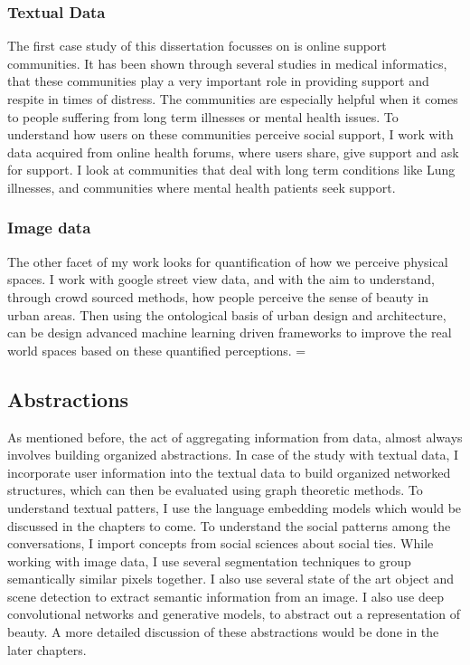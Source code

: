 \subsubsection{Textual Data}
The first case study of this dissertation focusses on is online support communities. It has been shown through several studies in medical informatics, that these communities play a very important role in providing support and respite in times of distress. The communities are especially helpful when it comes to people suffering from long term illnesses or mental health issues. 
To understand how users on these communities perceive social support, I work with data acquired from online health forums, where users share, give support and ask for support. I look at communities that deal with long term conditions like Lung illnesses, and communities where mental health patients seek support. 

\subsubsection{Image data}
The other facet of my work looks for quantification of how we perceive physical spaces. I work with google street view data, and with the aim to understand, through crowd sourced methods, how people perceive the sense of beauty in urban areas. Then using the ontological basis of urban design and architecture, can be design advanced machine learning driven frameworks to improve the real world spaces based on these quantified perceptions. =

\subsection{Abstractions}
As mentioned before, the act of aggregating information from data, almost always involves building organized abstractions. In case of the study with textual data, I incorporate user information into the textual data to build organized networked structures, which can then be evaluated using graph theoretic methods. To understand textual patters, I use the language embedding models which would be discussed in the chapters to come. To understand the social patterns among the conversations, I import concepts from social sciences about social ties.  
While working with image data, I use several segmentation techniques to group semantically similar pixels together. I also use several state of the art object and scene detection to extract semantic information from an image. I also use deep convolutional networks and generative models, to abstract out a representation of beauty. A more detailed discussion of these abstractions would be done in the later chapters.  

